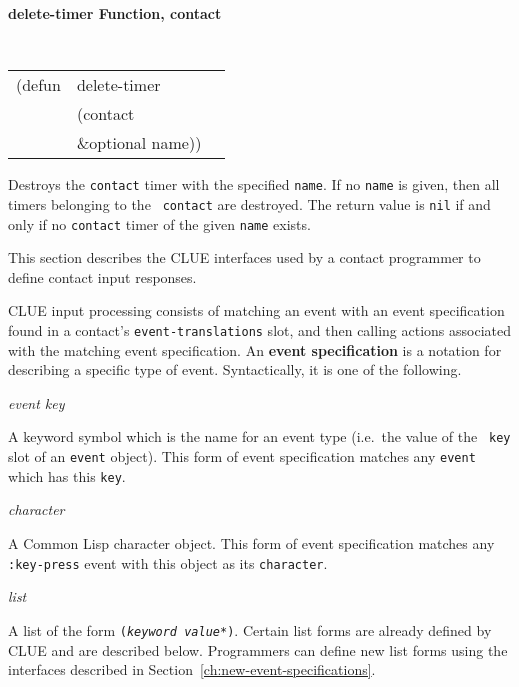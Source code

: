 \documentclass[twoside]{book}
\begin{document}
\begin{sloppy}
{\large {\bf delete-timer \hfill Function, contact}} 
\begin{flushright} \parbox[t]{6.125in}{
\tt
\begin{tabular}{lll}
\raggedright
(defun & delete-timer & \\ 
& (contact\\ 
& \&optional name))
\end{tabular}
\rm

}\end{flushright}

\begin{flushright} \parbox[t]{6.125in}{Destroys the {\tt contact} timer
with the specified {\tt name}. If no {\tt name} is given, then all timers
belonging to the {\tt
contact} are destroyed. The return value is {\tt nil} if and
only if no {\tt contact} timer of the given {\tt name} exists.

\rm

}\end{flushright}

{\samepage
{}
This section describes the CLUE interfaces used by a contact programmer to
define contact input responses.

CLUE input processing consists of matching an event with an event specification
found in a contact's {\tt event-translations} slot, and then calling actions
associated with the matching event specification.
An {\bf event specification} is a notation for
describing a specific type of event. Syntactically, it is one of the
following.
}

\parbox[t]{.75in}{{\em event key}}\parbox[t]{5.75in}{
A keyword symbol which is the name for an event type (i.e.\ the value of the {\tt
key} slot of an {\tt event} object). This form of event specification
matches any {\tt event} which has this {\tt key}.} 

\parbox[t]{.75in}{{\em character}}\parbox[t]{5.75in}{
A Common Lisp character object. This form of event specification matches any
{\tt :key-press} event with this object as its {\tt character}.}

\parbox[t]{.75in}{{\em list}}\parbox[t]{5.75in}{
A list of the form {\tt ({\em keyword} {\em value}*)}. Certain list forms are
already defined by CLUE and are described below. Programmers can define new list
forms using the interfaces described in
Section~\ref{ch:new-event-specifications}.}


\end{sloppy}
\end{document}
